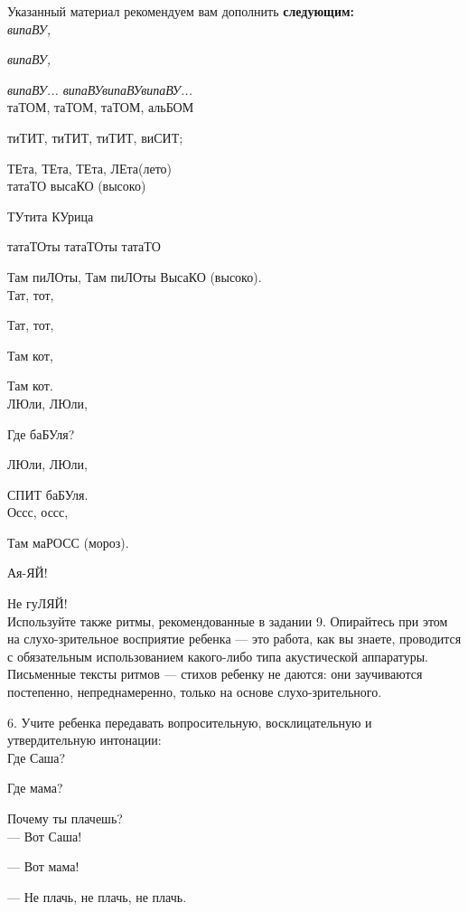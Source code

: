\documentclass{book}
\renewcommand{\emph}[1]{\textit{#1}}
\begin{document}
Указанный материал рекомендуем вам дополнить \textbf{следующим:} \\

\emph{випаВУ,}

\emph{випаВУ,}

\emph{випаВУ... випаВУвипаВУвипаВУ...} \\

таТОМ, таТОМ, таТОМ, альБОМ

тиТИТ, тиТИТ, тиТИТ, виСИТ;

ТЕта, ТЕта, ТЕта, ЛЕта(лето) \\

татаТО высаКО (высоко)

ТУтита КУрица

татаТОты татаТОты татаТО

Там пиЛОты, Там пиЛОты ВысаКО (высоко). \\

Тат, тот,

Тат, тот,

Там кот,

Там кот. \\

ЛЮли, ЛЮли,

Где баБУля?

ЛЮли, ЛЮли,

СПИТ баБУля. \\

Оссс, оссс,

Там маРОСС (мороз).

Ая-ЯЙ!

Не гуЛЯЙ! \\


Используйте также ритмы, рекомендованные в задании 9. Опирайтесь при
этом на слухо-зрительное восприятие ребенка --- это работа, как вы
знаете, проводится с обязательным использованием какого-либо типа
акустической аппаратуры. Письменные тексты ритмов --- стихов ребенку не
даются: они заучиваются постепенно, непреднамеренно, только на основе
слухо-зрительного.

6. Учите ребенка передавать вопросительную, восклицательную и
утвердительную интонации: \\

Где Саша?

Где мама?

Почему ты плачешь? \\

--- Вот Саша!

--- Вот мама!

--- Не плачь, не плачь, не плачь. \\
\end{document}
